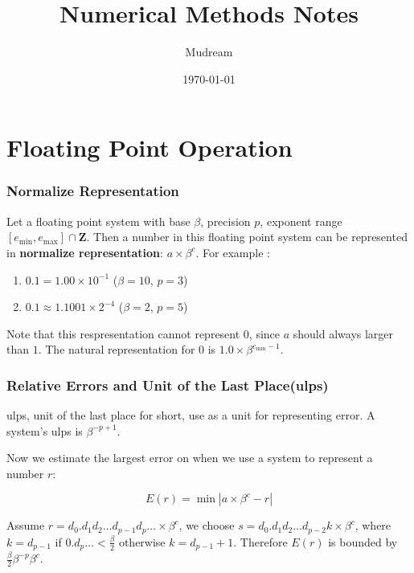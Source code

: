 \documentclass{article}
\title{Numerical Methods Notes}
\author{Mudream}
\date{\today}
\begin{document}
    \maketitle
    \part{Floating Point Operation}
        \section{Normalize Representation}

        Let a floating point system with base $\beta$, precision $p$, 
        exponent range $[e_{\min}, e_{\max}]\cap\textbf{Z}$. Then a number in this 
        floating point system can be represented in 
        \textbf{normalize representation}: $a \times \beta^c$.
        For example : 
        
        \begin{enumerate}
            \item $0.1 = 1.00 \times 10^{-1}$ ($\beta = 10$, $p = 3$)
            \item $0.1 \approx 1.1001 \times 2^{-4}$ ($\beta = 2$, $p = 5$)
        \end{enumerate}

        Note that this respresentation cannot represent $0$,
        since $a$ should always larger than $1$.
        The natural representation for $0$ is $1.0 \times \beta^{e_{\min} - 1}$.

        \section{Relative Errors and Unit of the Last Place(ulps)}

        ulps, unit of the last place for short, use as a unit for representing error.
        A system's ulps is $\beta^{-p+1}$.

        Now we estimate the largest error on when we use a system to represent a number $r$:

        \[ 
            E(r) = \min|a\times\beta^c - r|
        \]

        Assume $r = d_0.d_1d_2 \dots d_{p-1}d_p \dots \times \beta^c$,
        we choose $s = d_0.d_1d_2 \dots d_{p-2}k \times \beta^c$,
        where $k = d_{p-1}$ if $0.d_p \dots < \frac{\beta}{2}$ 
        otherwise $k = d_{p-1} + 1$. Therefore $E(r)$ is bounded by $\frac{\beta}{2}\beta^{-p}\beta^c$.
\end{document}
